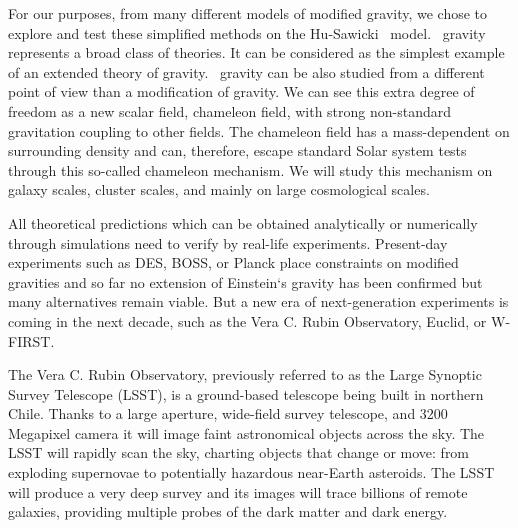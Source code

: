 For our purposes, from many different models of modified gravity, we chose to explore and test these simplified methods on the Hu-Sawicki \fR\ model. \fR\ gravity represents a broad class of theories. It can be considered as the simplest example of an extended theory of gravity. \fR\ gravity can be also studied from a different point of view than a modification of gravity. We can see this extra degree of freedom as a new scalar field, chameleon field, with strong non-standard gravitation coupling to other fields. The chameleon field has a mass-dependent on surrounding density and can, therefore, escape standard Solar system tests through this so-called chameleon mechanism. We will study this mechanism on galaxy scales, cluster scales, and mainly on large cosmological scales.

All theoretical predictions which can be obtained analytically or numerically through simulations need to verify by real-life experiments. Present-day experiments such as DES, BOSS, or Planck place constraints on modified gravities and so far no extension of Einstein`s gravity has been confirmed but many alternatives remain viable. But a new era of next-generation experiments is coming in the next decade, such as the Vera C. Rubin Observatory, Euclid, or W-FIRST.

The Vera C. Rubin Observatory, previously referred to as the Large Synoptic Survey Telescope (LSST), is a ground-based telescope being built in northern Chile. Thanks to a large aperture, wide-field survey telescope, and 3200 Megapixel camera it will image faint astronomical objects across the sky. The LSST will rapidly scan the sky, charting objects that change or move: from exploding supernovae to potentially hazardous near-Earth asteroids. The LSST will produce a very deep survey and its images will trace billions of remote galaxies, providing multiple probes of the dark matter and dark energy.

